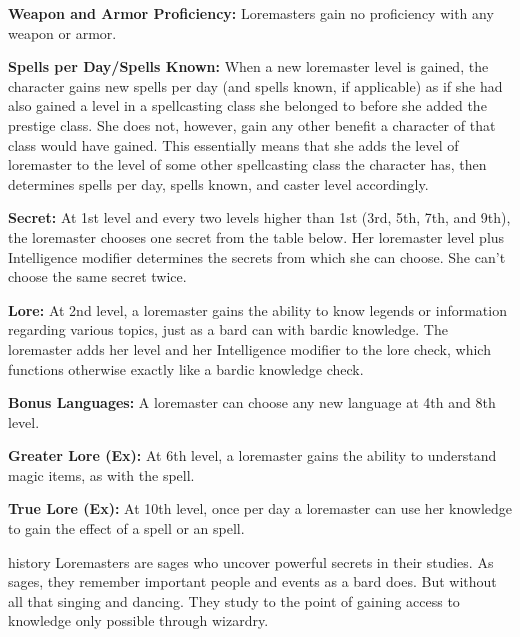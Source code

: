 {
\textbf{Weapon and Armor Proficiency:} Loremasters gain no proficiency with any weapon or armor.

\textbf{Spells per Day/Spells Known:} When a new loremaster level is gained, the character gains new spells per day (and spells known, if applicable) as if she had also gained a level in a spellcasting class she belonged to before she added the prestige class. She does not, however, gain any other benefit a character of that class would have gained. This essentially means that she adds the level of loremaster to the level of some other spellcasting class the character has, then determines spells per day, spells known, and caster level accordingly.

\textbf{Secret:} At 1st level and every two levels higher than 1st (3rd, 5th, 7th, and 9th), the loremaster chooses one secret from the table below. Her loremaster level plus Intelligence modifier determines the secrets from which she can choose. She can't choose the same secret twice.


\textbf{Lore:} At 2nd level, a loremaster gains the ability to know legends or information regarding various topics, just as a bard can with bardic knowledge. The loremaster adds her level and her Intelligence modifier to the lore check, which functions otherwise exactly like a bardic knowledge check.

\textbf{Bonus Languages:} A loremaster can choose any new language at 4th and 8th level.

\textbf{Greater Lore (Ex):} At 6th level, a loremaster gains the ability to understand magic items, as with the  spell.

\textbf{True Lore (Ex):} At 10th level, once per day a loremaster can use her knowledge to gain the effect of a  spell or an  spell.
}
{}
{history}
{Loremasters are sages who uncover powerful secrets in their studies.}
{As sages, they remember important people and events as a bard does. But without all that singing and dancing.}
{They study to the point of gaining access to knowledge only possible through wizardry.}